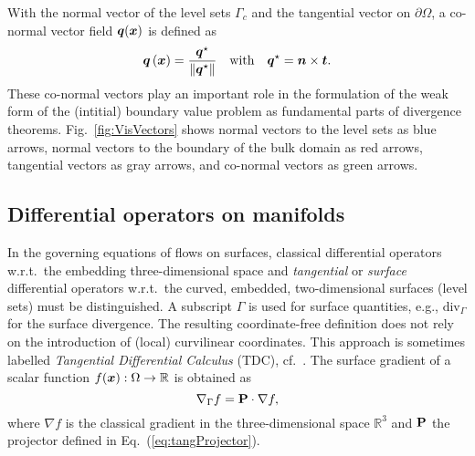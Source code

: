 \documentclass[12pt, twoside, english]{article}
\numberwithin{equation}{section}
\newcommand{\vek}[1]{\mathchoice{\displaystyle\boldsymbol#1}
{\textstyle\boldsymbol#1}{\scriptstyle\boldsymbol#1}
{\scriptscriptstyle\boldsymbol#1}}
\newcommand{\mat}[1]{\mathchoice{\displaystyle\mathbf#1}
{\textstyle\mathbf#1}{\scriptstyle\mathbf#1}
{\scriptscriptstyle\mathbf#1}}
\begin{document}
With the normal vector of the level sets $\Gamma_{\!c}$ and the tangential vector on $\partial \Omega$, a co-normal vector field $\vek{q}(\vek{x})$ is defined as
\begin{equation}
	\vek{q}\left(\vek{x}\right)=\frac{\vek{q}^{\star}}{\left\Vert \vek{q}^{\star}\right\Vert }\quad\textrm{with}\quad\vek{q}^{\star}=\vek{n} \times \vek{t}.\label{eq:Co-normalVector_q}
\end{equation}
These co-normal vectors play an important role in the formulation of the weak form of the (intitial) boundary value problem as fundamental parts of divergence theorems. Fig.~\ref{fig:VisVectors} shows normal vectors to the level sets as blue arrows, normal vectors to the boundary of the bulk domain as red arrows, tangential vectors as gray arrows, and co-normal vectors as green arrows.

\subsection{Differential operators on manifolds}\label{subsec:DiffOp}
In the governing equations of flows on surfaces, classical differential operators w.r.t.~the embedding three-dimensional space and \emph{tangential} or \emph{surface} differential operators w.r.t.~the curved, embedded, two-dimensional surfaces (level sets) must be distinguished. A subscript $\Gamma$ is used for surface quantities, e.g., $\mathrm{div}_{\Gamma}$ for the surface divergence. The resulting coordinate-free definition does not rely on the introduction of (local) curvilinear coordinates. This approach is sometimes labelled \emph{Tangential Differential Calculus} (TDC), cf.~\cite{Delfour_2011a}. The surface gradient of a scalar function $f\!\left(\vek{x}\right):\Omega\to\mathbb{R}$ is obtained as \cite{Delfour_2011a,Dziuk_2010a,Jankuhn_2018a,Fries_2018a}
\begin{equation}
	\nabla_{\Gamma}f=\mat{P}\cdot\nabla f,\label{eq:SurfGradScalarImplicit}
\end{equation}
where $\nabla f$ is the classical gradient in the three-dimensional
space $\mathbb{R}^3$ and $\mat{P}$ the projector defined in Eq.~(\ref{eq:tangProjector}).
\end{document}
